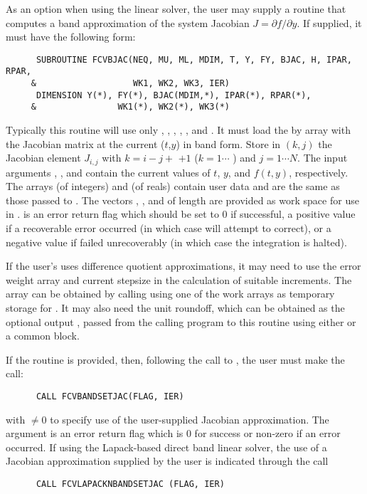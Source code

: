 \begin{Steps}
  As an option when using the {\band} linear solver, the user may supply a
  routine that computes a band approximation of the system Jacobian 
  $J = \partial f / \partial y$. If supplied, it must have the following form:
\begin{verbatim}
      SUBROUTINE FCVBJAC(NEQ, MU, ML, MDIM, T, Y, FY, BJAC, H, IPAR, RPAR,
     &                   WK1, WK2, WK3, IER)
      DIMENSION Y(*), FY(*), BJAC(MDIM,*), IPAR(*), RPAR(*),
     &                WK1(*), WK2(*), WK3(*)
\end{verbatim}
  Typically this routine will use only , , , , 
  , and .
  It must load the  by  array  with the Jacobian matrix
  at the current ($t$,$y$) in band form.  Store in $(k,j)$ the Jacobian
  element $J_{i,j}$ with $k = i - j + $  $ + 1$ ($k = 1 \cdots $
  ) and $j = 1 \cdots N$.
  The input arguments , , and  contain the current
  values of $t$, $y$, and $f(t,y)$, respectively.
  The arrays  (of integers) and  (of reals) contain user data
  and are the same as those passed to .
  The vectors , ,
  and  of length  are provided as work space for use in
  .
   is an error return flag which should be set to $0$ if successful, 
  a positive value if a recoverable error occurred (in which case {\cvode} will 
  attempt to correct), or a negative value if  failed unrecoverably 
  (in which case the integration is halted).

  If the user's  uses difference quotient approximations, it
  may need to use the error weight array  and current stepsize 
  in the calculation of suitable increments.  The array  can be
  obtained by calling  using one of the work arrays as
  temporary storage for .  It may also need the unit roundoff,
  which can be obtained as the optional output , passed from
  the calling program to this routine using either  or a common block.

  If the  routine is provided, then, following the call to ,
  the user must make the call:
\begin{verbatim}
      CALL FCVBANDSETJAC(FLAG, IER)
\end{verbatim}
  with  $\neq 0$ to specify use of the user-supplied Jacobian approximation.
  The argument  is an error return flag which is $0$ 
  for success or non-zero if an error occurred.
  If using the Lapack-based direct band linear solver, the use of a
  Jacobian approximation supplied by the user is indicated through the call
\begin{verbatim}
      CALL FCVLAPACKNBANDSETJAC (FLAG, IER)
\end{verbatim}


\end{Steps}

